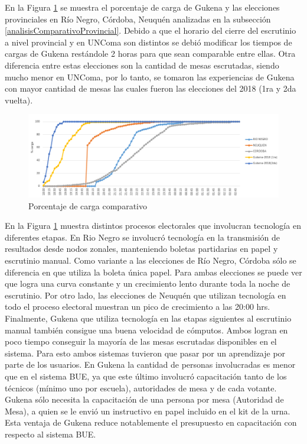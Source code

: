 En la Figura \ref{graf:provincialConGukena} se muestra el porcentaje de carga de Gukena y las elecciones provinciales en Río Negro, Córdoba, Neuquén analizadas en la subsección \ref{analisisComparativoProvincial}.
Debido a que el horario del cierre del escrutinio a nivel provincial y en UNComa son distintos se debió modificar los tiempos de cargas de Gukena restándole 2 horas para que sean comparable entre ellas. Otra diferencia entre estas elecciones son la cantidad de mesas escrutadas, siendo mucho menor en UNComa, por lo tanto, se tomaron las experiencias de Gukena con mayor cantidad de mesas las cuales fueron las elecciones del 2018 (1ra y 2da vuelta). 


\begin{figure}[h!]
    \begin{center}
        \includegraphics[width=\textwidth]{img/provincialGukena.png}
    \end{center}
  \caption{Porcentaje de carga comparativo}
  \label{graf:provincialConGukena}
\end{figure}

En la Figura \ref{graf:provincialConGukena} muestra distintos procesos electorales que involucran tecnología en diferentes etapas. En Rio Negro se involucró tecnología en la transmisión de resultados desde nodos zonales, manteniendo boletas partidarias en papel y escrutinio manual. Como variante a las elecciones de Río Negro, Córdoba sólo se diferencia en que utiliza la boleta única papel. Para ambas elecciones se puede ver que logra una curva constante y un crecimiento lento durante toda la noche de escrutinio. Por otro lado, las elecciones de Neuquén que utilizan tecnología en todo el proceso electoral muestran un pico de crecimiento a las 20:00 hrs. Finalmente, Gukena que utiliza tecnología en las etapas siguientes al escrutinio manual también consigue una buena velocidad de cómputos. Ambos logran en poco tiempo conseguir la mayoría de las mesas escrutadas disponibles en el sistema. Para esto ambos sistemas tuvieron que pasar por un aprendizaje por parte de los usuarios. En Gukena la cantidad de personas involucradas es menor que en el sistema BUE, ya que este último involucró capacitación tanto de los técnicos (mínimo uno por escuela), autoridades de mesa y de cada votante. Gukena sólo necesita la capacitación de una persona por mesa (Autoridad de Mesa), a quien se le envió un instructivo en papel incluido en el kit de la urna. Esta ventaja de Gukena reduce notablemente el presupuesto en capacitación con respecto al sistema BUE.

